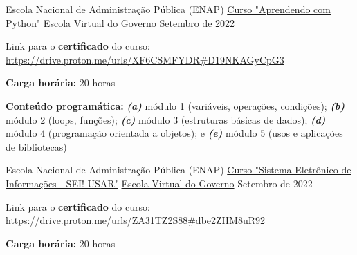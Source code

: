 

\begin{cventries}

  \cventry
    {Escola Nacional de Administração Pública (ENAP)} %
    {\href{https://www.escolavirtual.gov.br/curso/629}{Curso "Aprendendo com Python"}} %
    {\href{https://www.escolavirtual.gov.br/}{Escola Virtual do Governo}} %
    {Setembro de 2022} %
    {
      \begin{cvitems} %
        \item {Link para o \textbf{certificado} do curso: \url{https://drive.proton.me/urls/XF6CSMFYDR#D19NKAGyCpG3}}
        \item {\textbf{Carga horária:} 20 horas}
        \item{\textbf{Conteúdo programática:} \textbf{\textit{(a)}} módulo 1 (variáveis, operações, condições); \textbf{\textit{(b)}} módulo 2 (loops, funções); \textbf{\textit{(c)}} módulo 3 (estruturas básicas de dados); \textbf{\textit{(d)}} módulo 4 (programação orientada a objetos); e \textbf{\textit{(e)}} módulo 5 (usos e aplicações de bibliotecas)}
      \end{cvitems}
    }

  \cventry
    {Escola Nacional de Administração Pública (ENAP)} %
    {\href{https://www.escolavirtual.gov.br/curso/74}{Curso "Sistema Eletrônico de Informações - SEI! USAR"}} %
    {\href{https://www.escolavirtual.gov.br/}{Escola Virtual do Governo}} %
    {Setembro de 2022} %
    {
      \begin{cvitems} %
        \item {Link para o \textbf{certificado} do curso: \url{https://drive.proton.me/urls/ZA31TZ2S88#dbe2ZHM8uR92}}
        \item {\textbf{Carga horária:} 20 horas}
      \end{cvitems}
    }

\end{cventries}
